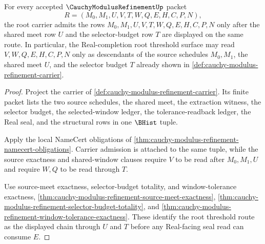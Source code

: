 \begin{theorem}
\label{thm:cauchy-modulus-refinement-root-carrier-threshold-admission}
For every accepted $\CauchyModulusRefinementUp$ packet
$$
R=(M_0,M_1,U,V,T,W,Q,E,H,C,P,N),
$$
the root carrier admits the rows $M_0,M_1,U,V,T,W,Q,E,H,C,P,N$ only after the shared meet row $U$ and the selector-budget row $T$ are displayed on the same route. In particular, the Real-completion root threshold surface may read $V,W,Q,E,H,C,P,N$ only as descendants of the source schedules $M_0,M_1$, the shared meet $U$, and the selector budget $T$ already shown in \autoref{def:cauchy-modulus-refinement-carrier}.
\end{theorem}
\begin{proof}
Project the carrier of \autoref{def:cauchy-modulus-refinement-carrier}. Its finite packet lists the two source schedules, the shared meet, the extraction witness, the selector budget, the selected-window ledger, the tolerance-readback ledger, the Real seal, and the structural rows in one $\BHist$ tuple.

Apply the local NameCert obligations of \autoref{thm:cauchy-modulus-refinement-namecert-obligations}. Carrier admission is attached to the same tuple, while the source exactness and shared-window clauses require $V$ to be read after $M_0,M_1,U$ and require $W,Q$ to be read through $T$.

Use source-meet exactness, selector-budget totality, and window-tolerance exactness, \autoref{thm:cauchy-modulus-refinement-source-meet-exactness}, \autoref{thm:cauchy-modulus-refinement-selector-budget-totality}, and \autoref{thm:cauchy-modulus-refinement-window-tolerance-exactness}. These identify the root threshold route as the displayed chain through $U$ and $T$ before any Real-facing seal read can consume $E$.
\end{proof}

